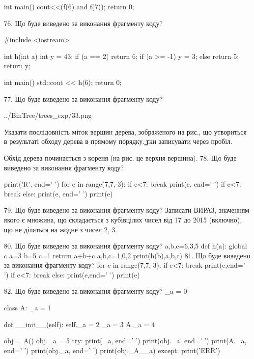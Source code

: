 \documentclass[11pt]{article}
\begin{document}
int main(){
    cout<<(f(6) and f(7));
    return 0;
}

76. Що буде виведено за виконання фрагменту коду?

#include <iostream>

int h(int a){
    int y = 43;
    if (a == 2) 
        return 6;
    if (a >= -1)
         y = 3;
    else
         return 5;
    return y;
}

int main(){
    std::cout << h(6);
    return 0;
}


77. Що буде виведено за виконання фрагменту коду?

\begin{center}
	{../BinTree/trees_exp/33.png}
\end{center}
Указати послідовність міток вершин дерева, зображеного на рис., що утвориться в результаті обходу дерева в прямому порядку. ̳тки записувати через пробіл.\par Обхід дерева починається з кореня (на рис. це верхня вершина).
78. Що буде виведено за виконання фрагменту коду?

print('R', end=' ')
for e in range(7,7,-3):
    if e<7:
        break
        print(e, end=' ')
    if e<7:
        break
    else:
        print(e, end=' ')
    print(e)

79. Що буде виведено за виконання фрагменту коду?
Записати ВИРАЗ, значенням якого є множина, що складається з кубівцілих чисел від 17 до 2015 (включно), що не діляться на жодне з чисел 2, 3.

80. Що буде виведено за виконання фрагменту коду?
a,b,c=6,3,5
   def h(a):
     global c     a=3
     b=5
     c=1
     return a+b+c
   a,b,c=1,0,2
   print(h(b),a,b,c)
81. Що буде виведено за виконання фрагменту коду?
for e in range(7,7,-3):
    if e<7:
        break
        print(e,end=' ')
    if e<7:
        break
    else:
        print(e,end=' ')
    print(e)

82. Що буде виведено за виконання фрагменту коду?
_a = 0

class A:
    _a = 1
    
    def __init__(self):
        self._a = 2
        _a = 3
        A._a = 4

obj = A()
obj._a = 5
try:
    print(_a, end=' ')
    print(obj._a, end=' ')
    print(A._a, end=' ')
    print(obj._a, end=' ')
    print(obj._A__a)
except:
    print('ERR')
\end{document}
